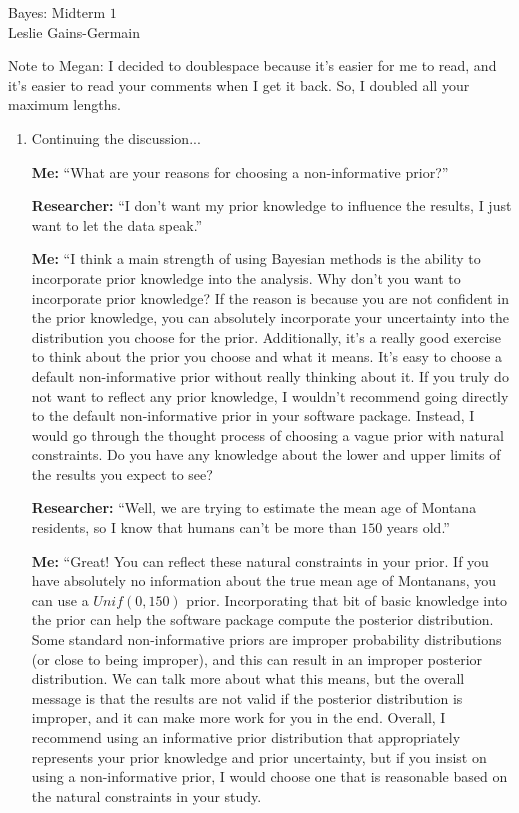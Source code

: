 \documentclass[11pt]{article}\usepackage[]{graphicx}\usepackage[]{color}
\begin{document}
  
  
\begin{center}
\large{Bayes: Midterm $1$} \\
Leslie Gains-Germain
\end{center}

\noindent Note to Megan: I decided to doublespace because it's easier for me to read, and it's easier to read your comments when I get it back. So, I doubled all your maximum lengths.
\begin{doublespacing}
\begin{enumerate}

\item Continuing the discussion...

{\bf Me:} ``What are your reasons for choosing a non-informative prior?'' 

{\bf Researcher:} ``I don't want my prior knowledge to influence the results, I just want to let the data speak.''

{\bf Me:} ``I think a main strength of using Bayesian methods is the ability to incorporate prior knowledge into the analysis. Why don't you want to incorporate prior knowledge? If the reason is because you are not confident in the prior knowledge, you can absolutely incorporate your uncertainty into the distribution you choose for the prior. Additionally, it's a really good exercise to think about the prior you choose and what it means. It's easy to choose a default non-informative prior without really thinking about it. If you truly do not want to reflect any prior knowledge, I wouldn't recommend going directly to the default non-informative prior in your software package. Instead, I would go through the thought process of choosing a vague prior with natural constraints. Do you have any knowledge about the lower and upper limits of the results you expect to see?

{\bf Researcher:} ``Well, we are trying to estimate the mean age of Montana residents, so I know that humans can't be more than $150$ years old.''

{\bf Me:} ``Great! You can reflect these natural constraints in your prior. If you have absolutely no information about the true mean age of Montanans, you can use a $Unif(0, 150)$ prior. Incorporating that bit of basic knowledge into the prior can help the software package compute the posterior distribution. Some standard non-informative priors are improper probability distributions (or close to being improper), and this can result in an improper posterior distribution. We can talk more about what this means, but the overall message is that the results are not valid if the posterior distribution is improper, and it can make more work for you in the end. Overall, I recommend using an informative prior distribution that appropriately represents your prior knowledge and prior uncertainty, but if you insist on using a non-informative prior, I would choose one that is reasonable based on the natural constraints in your study.



\end{enumerate}
\end{doublespacing}
\end{document}
